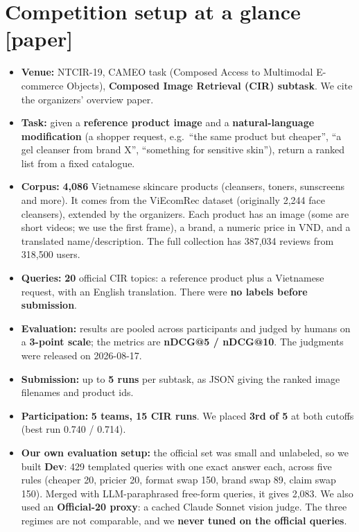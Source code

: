 \documentclass[11pt]{article}
\newcommand{\inpaper}{\textcolor{accent}{\small[paper]}}
\begin{document}
\section{Competition setup at a glance \inpaper}
\begin{itemize}
  \item \textbf{Venue:} NTCIR-19, CAMEO task (Composed Access to Multimodal E-commerce
        Objects), \textbf{Composed Image Retrieval (CIR) subtask}. We cite the organizers'
        overview paper.
  \item \textbf{Task:} given a \textbf{reference product image} and a
        \textbf{natural-language modification} (a shopper request, e.g.\ ``the same product
        but cheaper'', ``a gel cleanser from brand X'', ``something for sensitive skin''), return
        a ranked list from a fixed catalogue.
  \item \textbf{Corpus:} \textbf{4,086} Vietnamese skincare products (cleansers, toners,
        sunscreens and more). It comes from the ViEcomRec dataset (originally 2,244 face
        cleansers), extended by the organizers. Each product has an image (some are short
        videos; we use the first frame), a brand, a numeric price in VND, and a translated
        name/description. The full collection has 387,034 reviews from 318,500 users.
  \item \textbf{Queries:} \textbf{20} official CIR topics: a reference product plus a
        Vietnamese request, with an English translation. There were \textbf{no labels before
        submission}.
  \item \textbf{Evaluation:} results are pooled across participants and judged by humans on
        a \textbf{3-point scale}; the metrics are \textbf{nDCG@5 / nDCG@10}. The judgments were
        released on 2026-08-17.
  \item \textbf{Submission:} up to \textbf{5 runs} per subtask, as JSON giving the ranked
        image filenames and product ids.
  \item \textbf{Participation:} \textbf{5 teams, 15 CIR runs}. We placed \textbf{3rd of 5}
        at both cutoffs (best run 0.740 / 0.714).
  \item \textbf{Our own evaluation setup:} the official set was small and unlabeled, so we
        built \textbf{Dev}: 429 templated queries with one exact answer each, across five rules
        (cheaper 20, pricier 20, format swap 150, brand swap 89, claim swap 150). Merged with
        LLM-paraphrased free-form queries, it gives 2,083. We also used an \textbf{Official-20
        proxy}: a cached Claude Sonnet vision judge. The three regimes are not comparable, and
        we \textbf{never tuned on the official queries}.
\end{itemize}
\end{document}
